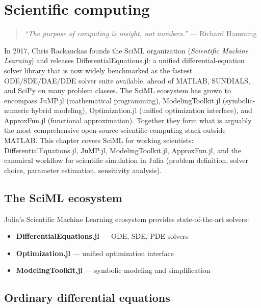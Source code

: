 \chapter{Scientific computing}
\label{ch:scientific}

\begin{quote}
\emph{``The purpose of computing is insight, not numbers.''}
--- Richard Hamming
\end{quote}

In 2017, Chris Rackauckas founds the SciML organization (\emph{Scientific Machine Learning}) and releases DifferentialEquations.jl: a unified differential-equation solver library that is now widely benchmarked as the fastest ODE/SDE/DAE/DDE solver suite available, ahead of MATLAB, SUNDIALS, and SciPy on many problem classes. The SciML ecosystem has grown to encompass JuMP.jl (mathematical programming), ModelingToolkit.jl (symbolic-numeric hybrid modeling), Optimization.jl (unified optimization interface), and ApproxFun.jl (functional approximation). Together they form what is arguably the most comprehensive open-source scientific-computing stack outside MATLAB. This chapter covers SciML for working scientists: DifferentialEquations.jl, JuMP.jl, ModelingToolkit.jl, ApproxFun.jl, and the canonical workflow for scientific simulation in Julia (problem definition, solver choice, parameter estimation, sensitivity analysis).

\section{The SciML ecosystem}

Julia's Scientific Machine Learning ecosystem provides state-of-the-art solvers:

\begin{itemize}
  \item \textbf{DifferentialEquations.jl} --- ODE, SDE, PDE solvers
  \item \textbf{Optimization.jl} --- unified optimization interface
  \item \textbf{ModelingToolkit.jl} --- symbolic modeling and simplification
\end{itemize}

\section{Ordinary differential equations}


